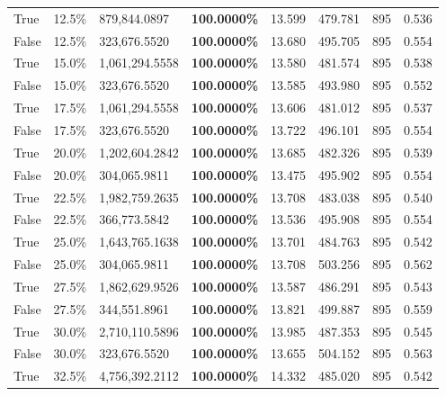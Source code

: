 \begin{table}[H]
\begin{tabular}{lllrllll}
\cline{1-8}
True & 12.5\% & 879,844.0897 & \bfseries \color{red} 100.0000\% & 13.599 & 479.781 & 895 & 0.536 \\
\cline{1-8}
False & 12.5\% & 323,676.5520 & \bfseries \color{red} 100.0000\% & 13.680 & 495.705 & 895 & 0.554 \\
\cline{1-8}
True & 15.0\% & 1,061,294.5558 & \bfseries \color{red} 100.0000\% & 13.580 & 481.574 & 895 & 0.538 \\
\cline{1-8}
False & 15.0\% & 323,676.5520 & \bfseries \color{red} 100.0000\% & 13.585 & 493.980 & 895 & 0.552 \\
\cline{1-8}
True & 17.5\% & 1,061,294.5558 & \bfseries \color{red} 100.0000\% & 13.606 & 481.012 & 895 & 0.537 \\
\cline{1-8}
False & 17.5\% & 323,676.5520 & \bfseries \color{red} 100.0000\% & 13.722 & 496.101 & 895 & 0.554 \\
\cline{1-8}
True & 20.0\% & 1,202,604.2842 & \bfseries \color{red} 100.0000\% & 13.685 & 482.326 & 895 & 0.539 \\
\cline{1-8}
False & 20.0\% & \color{red} 304,065.9811 & \bfseries \color{red} 100.0000\% & 13.475 & 495.902 & 895 & 0.554 \\
\cline{1-8}
True & 22.5\% & 1,982,759.2635 & \bfseries \color{red} 100.0000\% & 13.708 & 483.038 & 895 & 0.540 \\
\cline{1-8}
False & 22.5\% & 366,773.5842 & \bfseries \color{red} 100.0000\% & 13.536 & 495.908 & 895 & 0.554 \\
\cline{1-8}
True & 25.0\% & 1,643,765.1638 & \bfseries \color{red} 100.0000\% & 13.701 & 484.763 & 895 & 0.542 \\
\cline{1-8}
False & 25.0\% & \color{red} 304,065.9811 & \bfseries \color{red} 100.0000\% & 13.708 & 503.256 & 895 & 0.562 \\
\cline{1-8}
True & 27.5\% & 1,862,629.9526 & \bfseries \color{red} 100.0000\% & 13.587 & 486.291 & 895 & 0.543 \\
\cline{1-8}
False & 27.5\% & 344,551.8961 & \bfseries \color{red} 100.0000\% & 13.821 & 499.887 & 895 & 0.559 \\
\cline{1-8}
True & 30.0\% & 2,710,110.5896 & \bfseries \color{red} 100.0000\% & 13.985 & 487.353 & 895 & 0.545 \\
\cline{1-8}
False & 30.0\% & 323,676.5520 & \bfseries \color{red} 100.0000\% & 13.655 & 504.152 & 895 & 0.563 \\
\cline{1-8}
True & 32.5\% & 4,756,392.2112 & \bfseries \color{red} 100.0000\% & 14.332 & 485.020 & 895 & 0.542 \\

\end{tabular}
\end{table}
